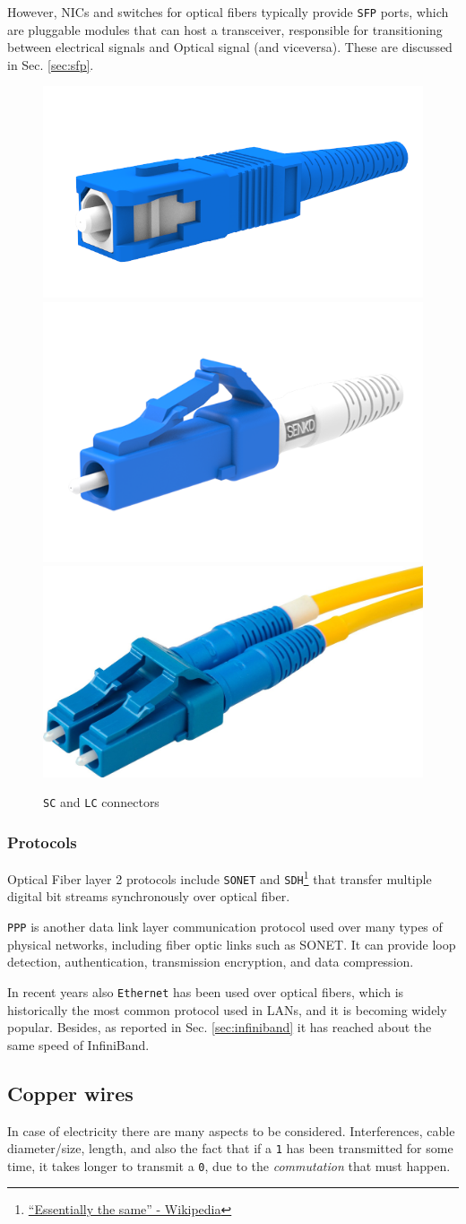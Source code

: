 However, NICs and switches for optical fibers typically provide \texttt{SFP} ports, which are pluggable modules that can host a transceiver, responsible for transitioning between electrical signals and Optical signal (and viceversa).
These are discussed in Sec. \ref{sec:sfp}.


\begin{figure}[htbp]
   \centering
   \includegraphics[width=0.25\columnwidth]{images/SC.png}
   \includegraphics[width=0.25\columnwidth]{images/LC.png}
   \includegraphics[width=0.25\columnwidth]{images/LC_coupled.JPG}
   \caption{\texttt{SC} and \texttt{LC} connectors}
   \label{fig:sc_lc_connectors}
\end{figure}

\subsubsection{Protocols}
Optical Fiber layer 2 protocols include \texttt{SONET} and \texttt{SDH}\footnote{\href{https://en.wikipedia.org/wiki/Synchronous_optical_networking}{``Essentially the same'' - Wikipedia}} that transfer multiple digital bit streams synchronously over optical fiber.

\texttt{PPP} is another data link layer communication protocol used over many types of physical networks, including fiber optic links such as SONET. It can provide loop detection, authentication, transmission encryption, and data compression.

In recent years also \texttt{Ethernet} has been used over optical fibers, which is historically the most common protocol used in LANs, and it is becoming widely popular.
Besides, as reported in Sec. \ref{sec:infiniband} it has reached about the same speed of InfiniBand.

\subsection{Copper wires}
In case of electricity there are many aspects to be considered. Interferences, cable diameter/size, length, and also the fact that if a \texttt{1} has been transmitted for some time, it takes longer to transmit a \texttt{0}, due to the \textit{commutation} that must happen.
\newpage

